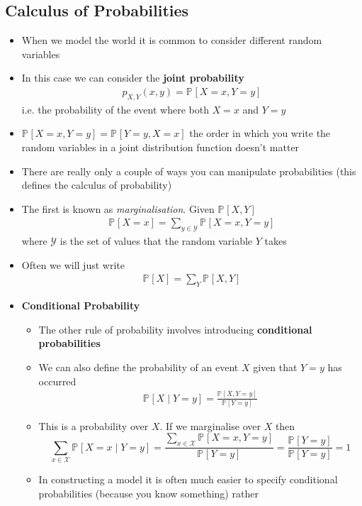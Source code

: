 \documentclass[11pt]{article}
\newcommand{\Prob}[2][]{\mathbb{P}_{#1\!}\left[ #2 \right]}
\begin{document}
\subsection{Calculus of Probabilities}
\label{sec:org7e9dfc9}
\begin{itemize}
\item When we model the world it is common to consider different random variables
\item In this case we can consider the \textbf{joint probability}
\begin{align*}
  p_{X,Y}(x, y) = \Prob{X=x, Y=y}
\end{align*}
i.e. the probability of the event where both \(X=x\) and \(Y=y\)
\item \(\Prob{X=x,Y=y} = \Prob{Y=y,X=x}\) the order in which you write the
random variables in a joint distribution function doesn't matter
\item There are really only a couple of ways you can manipulate
probabilities (this defines the calculus of probability)
\item The first is known as \emph{marginalisation}.  Given \(\Prob{X,Y}\)
\begin{align*}
  \Prob{X=x} = \sum_{y\in\mathcal{Y}} \Prob{X=x, Y=y}
\end{align*}
where \(\mathcal{Y}\) is the set of values that the random variable
\(Y\) takes
\item Often we will just write
\begin{align*}
  \Prob{X} = \sum_{Y} \Prob{X, Y}
\end{align*}
\item \textbf{Conditional Probability}
\begin{itemize}
\item The other rule of probability involves introducing \textbf{conditional
probabilities}
\item We can also define the probability of an event \(X\) given that
\(Y=y\) has occurred
\begin{align*}
  \Prob{X\mid Y=y} = \frac{\Prob{X,Y=y}}{\Prob{Y=y}}
\end{align*}
\item This is a probability over \(X\).  If we marginalise over \(X\) then
$$ \sum_{x\in \mathcal{X}} \Prob{X=x\mid Y=y}
      =  \frac{\sum_{x\in \mathcal{X}} \Prob{X=x,Y=y}}{\Prob{Y=y}}
      = \frac{\Prob{Y=y}}{\Prob{Y=y}} = 1 $$
\item In constructing a model it is often much easier to specify
conditional probabilities (because you know something) rather

\end{itemize}
\end{itemize}
\end{document}
